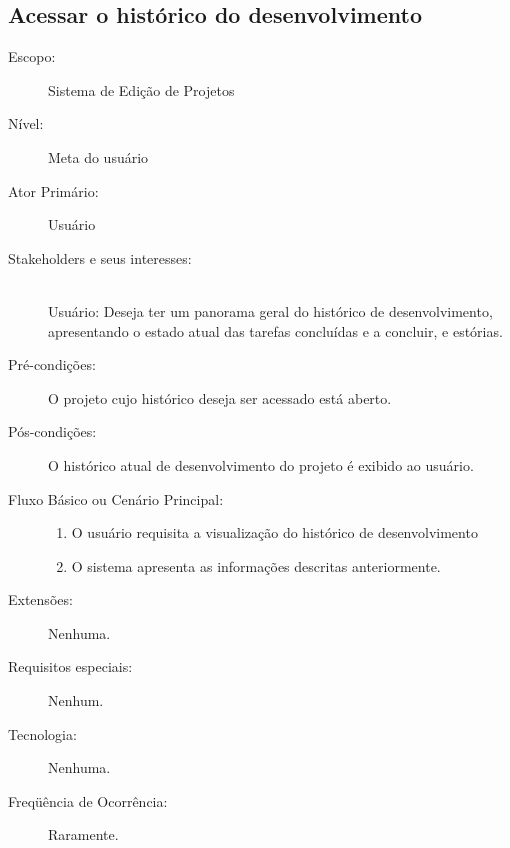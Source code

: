 \documentclass[brazil,times]{abnt}
\begin{document}
\subsection{Acessar o histórico do desenvolvimento}
\begin{description}
\item[Escopo:] Sistema de Edição de Projetos
\item[Nível:] Meta do usuário
\item[Ator Primário:] Usuário

\item[Stakeholders e seus interesses:] \hfill \\ 
Usuário: Deseja ter um panorama geral do histórico de desenvolvimento,
apresentando o estado atual das tarefas concluídas e a concluir, e estórias.

\item[Pré-condições:] O projeto cujo histórico deseja ser acessado está aberto.

\item[Pós-condições:] O histórico atual de desenvolvimento do projeto é exibido
ao usuário.

\item[Fluxo Básico ou Cenário Principal:] \hfill
\begin{enumerate}
  \item O usuário requisita a visualização do histórico de desenvolvimento
  \item O sistema apresenta as informações descritas anteriormente.
\end{enumerate}

\item[Extensões:] Nenhuma.
\item[Requisitos especiais:] Nenhum.

\item[Tecnologia:] Nenhuma.
\item[Freqüência de Ocorrência:] Raramente.

\end{description}
\end{document}

